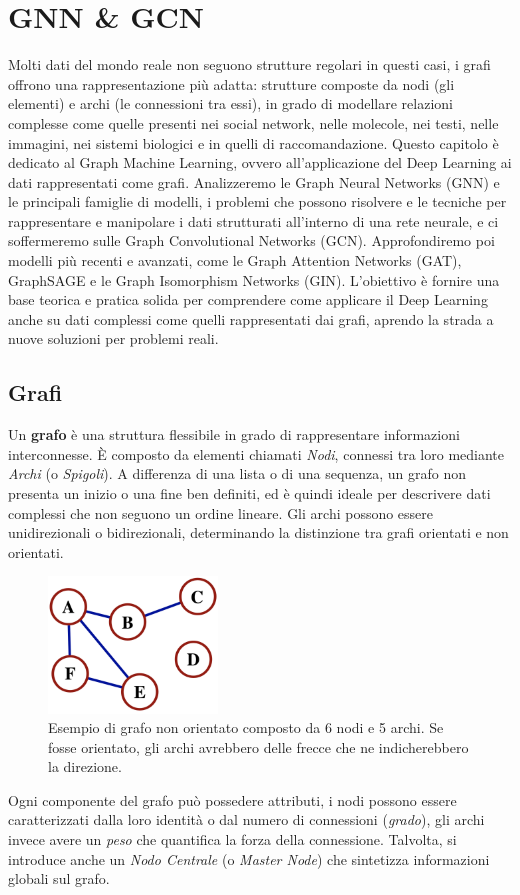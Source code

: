 \chapter{GNN \& GCN}
Molti dati del mondo reale non seguono strutture regolari in questi casi, i grafi offrono una rappresentazione più adatta: strutture composte da nodi (gli elementi) e archi (le connessioni tra essi), in grado di modellare relazioni complesse come quelle presenti nei social network, nelle molecole, nei testi, nelle immagini, nei sistemi biologici e in quelli di raccomandazione. Questo capitolo è dedicato al Graph Machine Learning, ovvero all'applicazione del Deep Learning ai dati rappresentati come grafi. Analizzeremo le Graph Neural Networks (GNN) e le principali famiglie di modelli, i problemi che possono risolvere e le tecniche per rappresentare e manipolare i dati strutturati all’interno di una rete neurale, e ci soffermeremo sulle Graph Convolutional Networks (GCN). Approfondiremo poi modelli più recenti e avanzati, come le Graph Attention Networks (GAT), GraphSAGE e le Graph Isomorphism Networks (GIN). L’obiettivo è fornire una base teorica e pratica solida per comprendere come applicare il Deep Learning anche su dati complessi come quelli rappresentati dai grafi, aprendo la strada a nuove soluzioni per problemi reali.

\section{Grafi}

Un \textbf{grafo} è una struttura flessibile in grado di rappresentare informazioni interconnesse. È composto da elementi chiamati \textit{Nodi}, connessi tra loro mediante \textit{Archi} (o \textit{Spigoli}). A differenza di una lista o di una sequenza, un grafo non presenta un inizio o una fine ben definiti, ed è quindi ideale per descrivere dati complessi che non seguono un ordine lineare. Gli archi possono essere unidirezionali o bidirezionali, determinando la distinzione tra grafi orientati e non orientati.
\begin{figure}
    \centering
    \includegraphics[width=0.4\textwidth]{figure/Graph.png}
    \caption{Esempio di grafo non orientato composto da 6 nodi e 5 archi. Se fosse orientato, gli archi avrebbero delle frecce che ne indicherebbero la direzione.}
    \label{fig:enter-label}
\end{figure}
Ogni componente del grafo può possedere attributi, i nodi possono essere caratterizzati dalla loro identità o dal numero di connessioni (\textit{grado}), gli archi invece avere un \textit{peso} che quantifica la forza della connessione. Talvolta, si introduce anche un \textit{Nodo Centrale} (o \textit{Master Node}) che sintetizza informazioni globali sul grafo.

